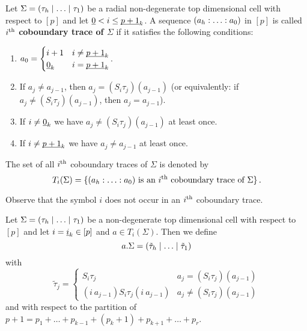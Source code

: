 \begin{defi}
    \label{cellular_models:dual_ehrenfried:cob_tr_radial}
    Let $\Sigma = \inhom$ be a radial non-degenerate top dimensional cell with respect to $[p]$ and let $\underline{\smash{0}} < i \le \underline{\smash{p+1}}_k$.
    A sequence $\homog[a]$ in $[p]$ is called $i^{\text{th}}$ {\bf coboundary trace of $\Sigma$} if it satisfies the following conditions:
    \begin{enumerate}
        \item \label{cellular_models:dual_ehrenfried:cob_tr_radial:normalization} $a_0 = \begin{cases}i+1& i \neq \underline{\smash{p+1}}_k \\ \underline{\smash{0}}_k & i = \underline{\smash{p+1}}_k\end{cases}$.
        \item \label{cellular_models:dual_ehrenfried:cob_tr_radial:choice} If $a_j \neq a_{j-1}$, then $a_j = (S_i\tau_j)(a_{j-1})$
                    (or equivalently: if $a_j \neq (S_i\tau_j)(a_{j-1})$, then $a_j = a_{j-1}$).
        \item \label{cellular_models:dual_ehrenfried:cob_tr_radial:i} If $i \neq \underline{\smash{0}}_k$ we have $a_j \neq (S_i\tau_j)(a_{j-1})$ at least once.
        \item \label{cellular_models:dual_ehrenfried:cob_tr_radial:i+1} If $i \neq \underline{\smash{p+1}}_k$ we have $a_j \neq a_{j-1}$ at least once.
    \end{enumerate}
    The set of all $i^{\text{th}}$ coboundary traces of $\Sigma$ is denoted by
    \[
        T_i(\Sigma) = \{ (a_h : \ldots : a_0) \text{ is an $i\Th$ coboundary trace of $\Sigma$} \} \,.
    \]    
\end{defi}


\begin{rem}
    \label{cellular_models:dual_ehrenfried:cob_tr_do_not_contain_i}
    Observe that the symbol $i$ does not occur in an $i^{\text{th}}$ coboundary trace.
\end{rem}

\begin{defi}
    \label{cellular_models:dual_ehrenfried:a_dot_sigma}
    Let $\Sigma = \inhom$ be a non-degenerate top dimensional cell with respect to $[p]$ and let $i = \underline{\smash{i}}_k \in [p]$ and $a \in T_i(\Sigma)$.
    Then we define
    \[
        a.\Sigma = \inhom[\tilde\tau]
    \]
    with
    \[
        \tilde\tau_j =
            \begin{cases}
                S_i\tau_j                               & a_j = (S_i\tau_j)(a_{j-1}) \\
                (i\ a_{j-1}) S_i\tau_j (i\ a_{j-1})     & a_j \neq (S_i\tau_j)(a_{j-1})
            \end{cases}
    \]
    and with respect to the partition of $p+1 = p_1 + \ldots + p_{k-1} + (p_k + 1 ) + p_{k+1} + \ldots + p_r$.
\end{defi}

